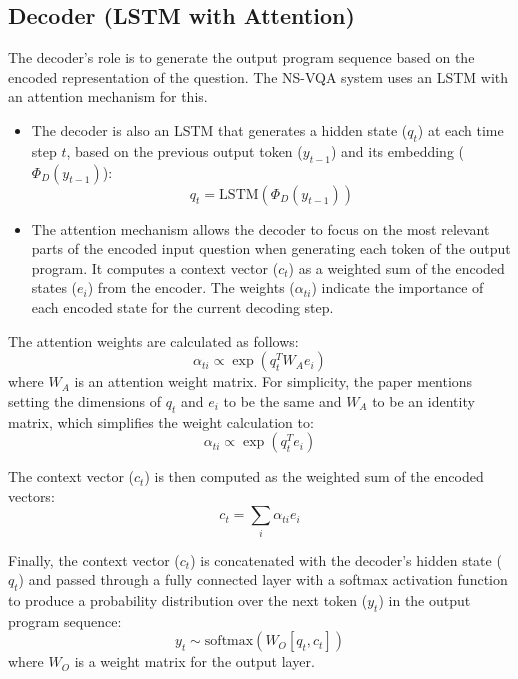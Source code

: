 \documentclass[10pt, oneside]{article}
\begin{document}
\subsection{Decoder (LSTM with Attention)}
The decoder's role is to generate the output program sequence based on the encoded representation of the question. The NS-VQA system uses an LSTM with an attention mechanism for this.
\begin{itemize}
    \item The decoder is also an LSTM that generates a hidden state ($q_t$) at each time step $t$, based on the previous output token ($y_{t-1}$) and its embedding ($\Phi_D\left(y_{t-1}\right)$):
    \begin{equation}
        q_t=\mathrm{LSTM}\left(\Phi_D\left(y_{t-1}\right)\right)
    \end{equation}
    \item The attention mechanism allows the decoder to focus on the most relevant parts of the encoded input question when generating each token of the output program. It computes a context vector ($c_t$) as a weighted sum of the encoded states ($e_i$) from the encoder. The weights ($\alpha_{ti}$) indicate the importance of each encoded state for the current decoding step.
\end{itemize}

The attention weights are calculated as follows:
\begin{equation}
    \alpha_{ti}\propto\exp{\left(q_t^TW_Ae_i\right)}
\end{equation}
where $W_A$ is an attention weight matrix. For simplicity, the paper \cite{Yi2018} mentions setting the dimensions of $q_t$ and $e_i$ to be the same and $W_A$ to be an identity matrix, which simplifies the weight calculation to:
\begin{equation}
    \alpha_{ti}\propto\exp{\left(q_t^Te_i\right)}
\end{equation}

The context vector ($c_t$) is then computed as the weighted sum of the encoded vectors:
\begin{equation}
    c_t=\sum_{i}{\alpha_{ti}e_i}
\end{equation}

Finally, the context vector ($c_t$) is concatenated with the decoder's hidden state ($q_t$) and passed through a fully connected layer with a softmax activation function to produce a probability distribution over the next token ($y_t$) in the output program sequence:
\begin{equation}
    y_t\sim\mathrm{softmax}\left(W_O\left[q_t,c_t\right]\right)
\end{equation}
where $W_O$ is a weight matrix for the output layer.
\end{document}
